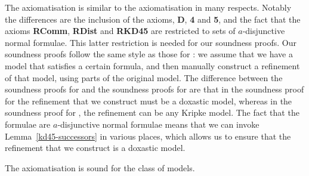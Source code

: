 The axiomatisation \axiomKDF{} is similar to the axiomatisation \axiomKF{} in
many respects. Notably the differences are the inclusion of the \axiomKF{}
axioms, {\bf D}, {\bf 4} and {\bf 5}, and the fact that the axioms {\bf RComm},
{\bf RDist} and {\bf RKD45} are restricted to sets of $a$-disjunctive normal
formulae. This latter restriction is needed for our soundness proofs. Our
soundness proofs follow the same style as those for \axiomKF{}: we assume that
we have a model that satisfies a certain formula, and then manually construct a
refinement of that model, using parts of the original model. The difference
between the soundness proofs for \axiomKF{} and the soundness proofs for
\axiomKDF{} are that in the soundness proof for \axiomKDF{} the refinement that
we construct must be a doxastic model, whereas in the soundness proof for
\axiomKF{}, the refinement can be any Kripke model.  The fact that the formulae
are $a$-disjunctive normal formulae means that we can invoke
Lemma~\ref{kd45-successors} in various places, which allows us to ensure that
the refinement that we construct is a doxastic model.

\begin{lemma}\label{kd45-sound}
The axiomatisation \axiomKDF{} is sound for the class of \classKD{} models.
\end{lemma}

